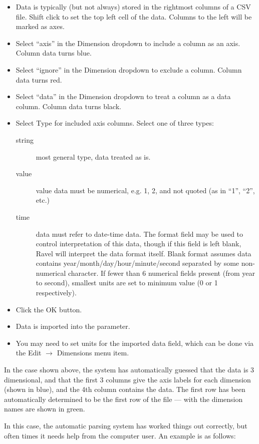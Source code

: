 \begin{itemize}
\item Data is typically (but not always) stored in the rightmost columns
of a CSV file. Shift click to set the top left cell of the data. Columns
to the left will be marked as axes. 
\item Select ``axis'' in the Dimension dropdown to include a column as
an axis. Column data turns blue. 
\item Select ``ignore'' in the Dimension dropdown to exclude a column.
Column data turns red. 
\item Select ``data'' in the Dimension dropdown to treat a column as a
data column. Column data turns black. 
\item Select Type for included axis columns. Select one of three types: 
\begin{description}
\item [{string}] most general type, data treated as is. 
\item [{value}] value data must be numerical, e.g. 1, 2, and not quoted
(as in ``1'', ``2'', etc.)
\item [{time}] data must refer to date-time data. The format field may
be used to control interpretation of this data, though if this field
is left blank, Ravel will interpret the data format itself. Blank
format assumes data contains year/month/day/hour/minute/second separated
by some non-numerical character. If fewer than 6 numerical fields
present (from year to second), smallest units are set to minimum value
(0 or 1 respectively). 
\end{description}
\item Click the OK button. 
\item Data is imported into the parameter. 
\item You may need to set units for the imported data field, which can be
done via the Edit $\rightarrow$ Dimensions menu item.
\end{itemize}
In the case shown above, the system has automatically guessed that
the data is 3 dimensional, and that the first 3 columns give the axis
labels for each dimension (shown in blue), and the 4th column contains
the data. The first row has been automatically determined to be the
first row of the file --- with the dimension names are shown in green.

In this case, the automatic parsing system has worked things out correctly,
but often times it needs help from the computer user. An example is
as follows:
\begin{center}
\par\end{center}

